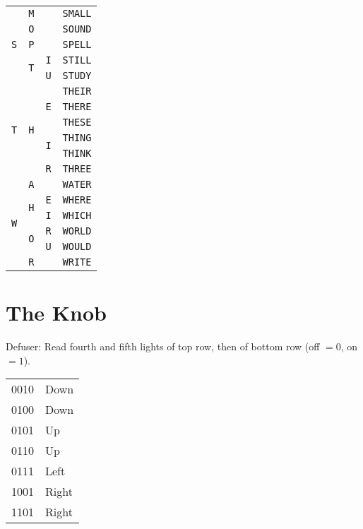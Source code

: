 \documentclass[11pt]{amsart}
\begin{document}
\begin{tabular}{|ccc|c|}
\hline
\multirow{5}{*}{\texttt{S}} & \texttt{M} & & \texttt{SMALL} \\
\cline{2-4}
                            & \texttt{O} & & \texttt{SOUND} \\
\cline{2-4}
                            & \texttt{P} & & \texttt{SPELL} \\
\cline{2-4}
                            & \multirow{2}{*}{\texttt{T}}
                              & \texttt{I} & \texttt{STILL} \\
\cline{3-4}
                            & & \texttt{U} & \texttt{STUDY} \\
\hline
\multirow{6}{*}{\texttt{T}} & \multirow{6}{*}{\texttt{H}} &
    \multirow{3}{*}{\texttt{E}} & \texttt{THEIR} \\
                            & & & \texttt{THERE} \\
                            & & & \texttt{THESE} \\
\cline{3-4}
                            &                             &
    \multirow{2}{*}{\texttt{I}} & \texttt{THING} \\
                            & & & \texttt{THINK} \\
\cline{3-4}
                            &                             &
    \texttt{R}                  & \texttt{THREE} \\
\hline
\multirow{6}{*}{\texttt{W}} & \texttt{A} & & \texttt{WATER} \\
\cline{2-4}
                            & \multirow{2}{*}{\texttt{H}} & \texttt{E} & \texttt{WHERE} \\
\cline{3-4}
                            &                             & \texttt{I} & \texttt{WHICH} \\
\cline{2-4}
                            & \multirow{2}{*}{\texttt{O}} & \texttt{R} & \texttt{WORLD} \\
\cline{3-4}
                            &                             & \texttt{U} & \texttt{WOULD} \\
\cline{2-4}
                            & \texttt{R} & & \texttt{WRITE} \\
\hline
\end{tabular}




\section{The Knob}

Defuser: Read fourth and fifth lights of top row, then of bottom row (off $=
0$, on $= 1$).

\begin{tabular}{|l|l|}
\hline
0010 & Down \\
0100 & Down \\
0101 & Up \\
0110 & Up \\
0111 & Left \\
1001 & Right \\
1101 & Right \\
\hline
\end{tabular}
\end{document}
